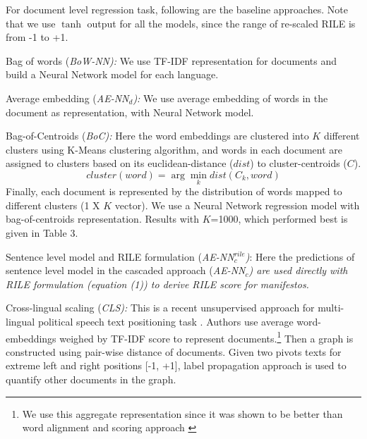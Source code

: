 \documentclass[11pt,a4paper]{article}
\newcommand{\argmin}{\arg\!\min}
\begin{document}
For document level regression task, following are the baseline approaches. Note that we use $\tanh$ output for all the models, since the range of re-scaled RILE is from -1 to +1.

\begin{description}
\item{Bag of words (\em{BoW-NN}):} We use TF-IDF representation for documents and build a Neural Network model  for each language.
\item{Average embedding (\em{AE-NN}$_{d}$):} We use average embedding of words in the document as representation, with Neural Network model.

\item{Bag-of-Centroids (\em{BoC}):} Here the word embeddings are clustered into $K$ different clusters using K-Means clustering algorithm, and  words in each document are assigned to clusters based on its euclidean-distance ($dist$) to cluster-centroids ($C$). 
\[ cluster (word) = \argmin_k dist(C_{k}, word) \]
Finally, each document is represented by the distribution of words mapped to different clusters (1 X $K$ vector). We use a Neural Network regression model with bag-of-centroids representation. Results with $K$=1000, which performed best is given in Table 3.

\item{Sentence level model and RILE formulation (\em{AE-NN}$_{c}^{rile}$)}: Here the predictions of sentence level model in the cascaded approach (\em{AE-NN$_{c}$}) \rm are used directly with RILE formulation (equation (1)) to derive RILE score for manifestos.

\item{Cross-lingual scaling (\em{CLS}):} This is a recent unsupervised approach for multi-lingual political speech text positioning task \cite{EACL}. Authors use average word-embeddings weighed by TF-IDF score to represent documents.\footnote{We use this aggregate representation since it was shown to be better than word alignment and scoring approach \cite{EACL}} Then a graph is constructed using pair-wise distance of documents. Given two pivots texts for extreme left and right positions [-1, +1], label propagation approach is used to quantify other documents in the graph.
\end{description}
\end{document}
